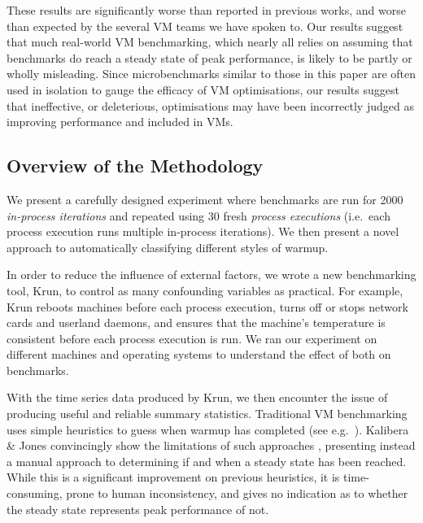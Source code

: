 \documentclass[acmlarge]{acmart}\settopmatter{printfolios=true}
\newcommand{\kalibera}{Kalibera \& Jones\xspace}
\newcommand{\krun}{Krun\xspace}
\newcommand{\numpexecs}{30\xspace}
\newcommand{\numiterations}{2000\xspace}
\begin{document}
These results are significantly worse than reported in previous works, and worse
than expected by the several VM teams we have spoken to. Our results suggest
that much real-world VM benchmarking, which nearly all relies on assuming
that benchmarks do reach a steady state of peak performance, is likely to be partly or wholly
misleading. Since microbenchmarks similar to those in this paper are often used
in isolation to gauge the efficacy of VM optimisations, our results suggest that
ineffective, or deleterious, optimisations may have been incorrectly judged as
improving performance and included in VMs.


\subsection{Overview of the Methodology}

We present a carefully designed experiment where benchmarks are run for \numiterations
\emph{in-process iterations} and repeated using \numpexecs fresh \emph{process
executions} (i.e.~each process execution runs multiple in-process iterations).
We then present a novel approach to automatically classifying
different styles of warmup.

In order to reduce the influence of external factors, we wrote a new
benchmarking tool, \krun, to control as many confounding variables as practical.
For example, \krun reboots machines before each process execution, turns off or stops network
cards and userland daemons, and ensures that the
machine's temperature is consistent before each process execution is run.
We ran our experiment on different machines and operating systems to understand
the effect of both on benchmarks.

With the time series data produced by \krun, we then encounter the issue of
producing useful and reliable summary statistics. Traditional VM benchmarking
uses simple heuristics to guess when warmup has completed (see
e.g.~\cite{georges07statistically}). \kalibera convincingly show the limitations of such approaches
\cite{kalibera13rigorous}, presenting instead a manual approach to determining
if and when a steady state has been reached. While this is a significant improvement on
previous heuristics, it is time-consuming, prone to human inconsistency, and gives no
indication as to whether the steady state represents peak performance of not.
\end{document}
